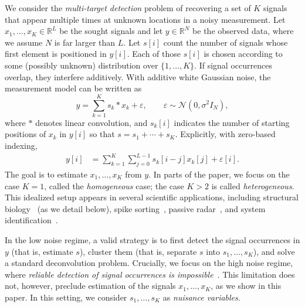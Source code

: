 \documentclass[12pt]{article}
\newcommand{\1}{\mathbf{1}}
\newcommand{\RL}{\mathbb{R}^L}
\newcommand{\RN}{\mathbb{R}^N}
\theoremstyle{plain}
\theoremstyle{definition}
\theoremstyle{remark}
\theoremstyle{plain}
\theoremstyle{remark}
\theoremstyle{plain}
\theoremstyle{plain}
\theoremstyle{plain}
\numberwithin{equation}{section}
\begin{document}

We consider the \emph{multi-target detection} problem of recovering a set of $K$ signals that appear 
multiple times at unknown locations in a noisy measurement.
Let ${x_1,\ldots,x_K\in\RL}$ be the sought signals and let $y\in\RN$ be the observed data, where we assume $N$ is  far larger than $L$. 
Let  $s[i]$ count the number of signals whose first element is positioned in $y[i]$. Each of those $s[i]$ is chosen according to some (possibly unknown) distribution over $\{1,\ldots,K\}$. 
If signal occurrences overlap, they interfere additively. %
With additive white Gaussian noise, the measurement model can be written as 
\begin{equation} 
	y  =  \sum_{k=1}^K s_k \ast x_k + \varepsilon, \qquad  \varepsilon   \sim \mathcal{N}(0,\sigma^2 I_N),
	\label{eq:model}
\end{equation}
where $\ast$ denotes linear convolution, and $s_k[i]$ indicates the number of starting positions of $x_k$ in $y[i]$ so that $s =  s_1+\cdots+s_K$. Explicitly, with zero-based indexing, %
\begin{align*}
	y[i] & = \sum_{k=1}^{K} \sum_{j = 0}^{L-1} s_k[i-j] x_k[j] + \varepsilon[i].
\end{align*}
The goal is  to estimate $x_1,\ldots,x_K$ from $y$. %
In parts of the paper, we focus on the case $K = 1$, called the \emph{homogeneous} case; the case $K > 2$ is called \emph{heterogeneous}.
This idealized setup appears in several scientific applications, including structural biology~\cite{bendory2018toward} (as we detail below), spike sorting~\cite{lewicki1998review}, passive radar~\cite{gogineni2017passive}, and system identification~\cite{ljung1998system}. 

In the low noise regime, a valid strategy is to first detect the signal occurrences in $y$ (that is, estimate $s$), cluster them (that is, separate $s$ into $s_1,\ldots,s_K$), and solve a standard deconvolution problem. Crucially, we focus on the high noise regime, where \emph{reliable detection of signal occurrences is  impossible}~\cite{bendory2018toward,aguerrebere2016fundamental}.
This limitation does not, however, preclude estimation of the signals $x_1,\ldots,x_K$, as we show in this paper. In this setting, we consider  $s_1,\ldots,s_K$  as \emph{nuisance variables}.
\end{document}
